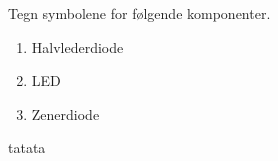 \begin{question}[name=Spørsmål, topic=tyristor]
	Tegn symbolene for følgende komponenter.
	\begin{enumerate}[label=\roman*]
		\item Halvlederdiode
		\item LED
		\item Zenerdiode
	\end{enumerate}
\end{question}


\begin{solution}[name=Løsningsforslag]
tatata

\end{solution}